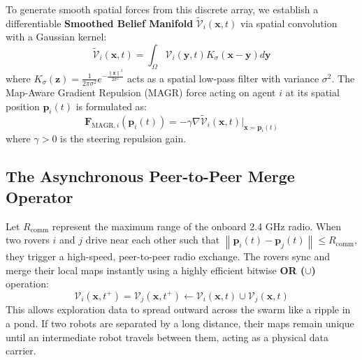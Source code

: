 \documentclass[letterpaper, 10pt, conference]{IEEEtran}
\newcommand{\norm}[1]{\left\lVert#1\right\rVert}
\begin{document}
To generate smooth spatial forces from this discrete array, we establish a differentiable \textbf{Smoothed Belief Manifold} $\tilde{\mathcal{V}}_i(\mathbf{x}, t)$ via spatial convolution with a Gaussian kernel:
\begin{equation}
    \tilde{\mathcal{V}}_i(\mathbf{x}, t) = \int_{\Omega} \mathcal{V}_i(\mathbf{y}, t) K_{\sigma}(\mathbf{x} - \mathbf{y}) d\mathbf{y}
\end{equation}
where $K_{\sigma}(\mathbf{z}) = \frac{1}{2\pi\sigma^2} e^{-\frac{\norm{\mathbf{z}}^2}{2\sigma^2}}$ acts as a spatial low-pass filter with variance $\sigma^2$. The Map-Aware Gradient Repulsion (MAGR) force acting on agent $i$ at its spatial position $\mathbf{p}_i(t)$ is formulated as:
\begin{equation}
    \mathbf{F}_{\text{MAGR}, i}(\mathbf{p}_i(t)) = -\gamma \nabla \tilde{\mathcal{V}}_i(\mathbf{x}, t) \Big|_{\mathbf{x} = \mathbf{p}_i(t)}
\end{equation}
where $\gamma > 0$ is the steering repulsion gain.

\subsection{The Asynchronous Peer-to-Peer Merge Operator}
Let $R_{\text{comm}}$ represent the maximum range of the onboard 2.4 GHz radio. When two rovers $i$ and $j$ drive near each other such that $\norm{\mathbf{p}_i(t) - \mathbf{p}_j(t)} \leq R_{\text{comm}}$, they trigger a high-speed, peer-to-peer radio exchange. The rovers sync and merge their local maps instantly using a highly efficient bitwise \textbf{OR ($\cup$)} operation:
\begin{equation}
    \mathcal{V}_i(\mathbf{x}, t^+) = \mathcal{V}_j(\mathbf{x}, t^+) \leftarrow \mathcal{V}_i(\mathbf{x}, t) \cup \mathcal{V}_j(\mathbf{x}, t)
\end{equation}
This allows exploration data to spread outward across the swarm like a ripple in a pond. If two robots are separated by a long distance, their maps remain unique until an intermediate robot travels between them, acting as a physical data carrier.
\end{document}
